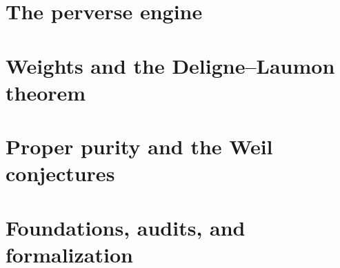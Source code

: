 \documentclass[11pt,openany]{book}
\theoremstyle{definition}
\theoremstyle{remark}
\begin{document}
\part{The perverse engine}





\part{Weights and the Deligne--Laumon theorem}







\part{Proper purity and the Weil conjectures}





\appendix
\part{Foundations, audits, and formalization}






\backmatter


\end{document}
